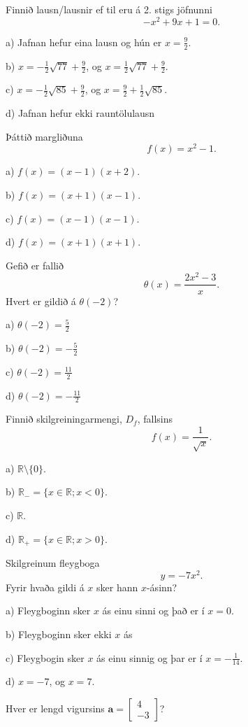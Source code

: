 \item Finnið lausn/lausnir ef til eru á 2. stigs jöfnunni $$- x^{2} + 9 x + 1=0.$$

a) Jafnan hefur eina lausn og hún er $x=\frac{9}{2}$.

b) $x = - \frac{1}{2} \sqrt{77} + \frac{9}{2}$, og $x=\frac{1}{2} \sqrt{77} + \frac{9}{2}$.

c) $x = - \frac{1}{2} \sqrt{85} + \frac{9}{2}$, og $x=\frac{9}{2} + \frac{1}{2} \sqrt{85}$. %

d) Jafnan hefur ekki rauntölulausn


\item Þáttið margliðuna $$f(x) = x^2 -1.$$

a) $f(x) = (x-1)(x+2)$.

b) $f(x) = (x+1)(x-1)$. %

c) $f(x) = (x-1)(x-1)$.

d) $f(x) = (x+1)(x+1)$.


\item Gefið er fallið $$\displaystyle\theta(x)=\frac{2x^2-3}{x}.$$ Hvert er gildið á $\theta(-2)$?

a) $\theta(-2)=\frac{5}{2}$

b) $\theta(-2)=-\frac{5}{2}$ %

c) $\theta(-2)=\frac{11}{2}$

d) $\theta(-2)=-\frac{11}{2}$


\item Finnið skilgreiningarmengi, $D_f$, fallsins $$f(x) = \frac{1}{\sqrt x}.$$

a) $\mathbb{R} \setminus \{0\}$.

b) $\mathbb{R}_- = \{ x \in \mathbb{R} ; x<0\}$.

c) $\mathbb{R}$.

d) $\mathbb{R}_+ = \{ x \in \mathbb{R} ; x>0\}$. %


\item Skilgreinum fleygboga $$y=- 7 x^{2}.$$ Fyrir hvaða gildi á $x$ sker hann $x$-ásinn?

a) Fleygboginn sker $x$ ás einu sinni og það er í $x=0$. %

b) Fleygboginn sker ekki $x$ ás

c) Fleygbogin sker $x$ ás einu sinnig og þar er í $x=- \frac{1}{14}$.

d) $x=-7$, og $x=7$.


\item Hver er lengd vigursins $ \mathbf{a} =
\left[
\begin{matrix}
4\\
-3
\end{matrix}
\right]$?

